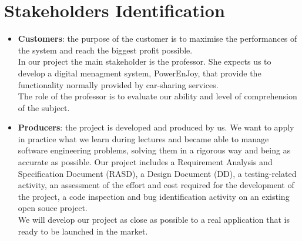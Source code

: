 \section{Stakeholders Identification}
\begin{itemize}
	\item{{\bf Customers}: the purpose of the customer is to maximise the performances of the system and reach the biggest profit possible.
	\\In our project the main stakeholder is the professor. She expects us to develop a digital menagment system, PowerEnJoy, that provide the functionality normally provided by car-sharing services.  
	\\The role of the professor is to evaluate our ability and level of comprehension of the subject.}
	\item{{\bf Producers}: the project is developed and produced by us. We want to apply in practice what we learn during lectures and became able to manage software engineering problems, solving them in a rigorous way and being as accurate as possible. Our project includes a Requirement Analysis and Specification Document (RASD), a Design Document (DD), a testing-related activity, an
	assessment of the effort and cost required for the development of the project, a code inspection and bug identification activity on an existing open souce project. 
	\\We will develop our project as close as possible to a real application that is ready to be launched in the market.}
\end{itemize}
